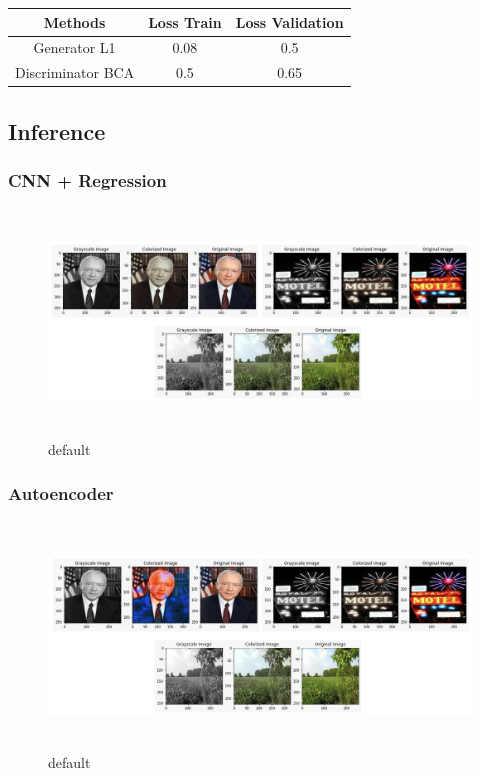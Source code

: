 \documentclass{article}
\begin{document}
\begin{center}
\begin{tabular}{ |c |c|c| } 
\hline
\textbf{Methods} & \textbf{Loss Train} & \textbf{Loss Validation} \\
\hline
Generator L1 & 0.08 & 0.5 \\
\hline
Discriminator BCA & 0.5 & 0.65   \\ 
\hline
\end{tabular}
\end{center}

\subsection{Inference}

\subsubsection{CNN + Regression}

\begin{figure}[htp]

    \centering
    \includegraphics[width=15cm, height=6cm]{regression-inference.png}\hfill
    \caption{default}
    
\end{figure}

\subsubsection{Autoencoder}

\begin{figure}[htp]

    \centering
    \includegraphics[width=15cm, height=6cm]{autoencoder-inference.png}\hfill
    \caption{default}
    
\end{figure}
\pagebreak
\end{document}
